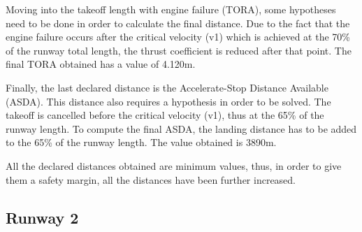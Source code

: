 		
		Moving into the takeoff length with engine failure (TORA), some hypotheses need to be done in order to calculate the final distance.  Due to the fact that the engine failure occurs after the critical velocity (v1) which is achieved at the 70\% of the runway total length, the thrust coefficient is reduced after that point. The final TORA obtained has a value of 4.120m.
		
		
		Finally, the last declared distance is the Accelerate-Stop Distance Available (ASDA). This distance also requires a hypothesis in order to be solved. The takeoff is cancelled before the critical velocity (v1), thus at the 65\% of the runway length. To compute the final ASDA, the landing distance has to be added to the 65\% of the runway length. The value obtained is 3890m.  
		
		All the declared distances obtained are minimum values, thus, in order to give them a safety margin, all the distances have been further increased. 
		
		\subsection{Runway 2}
	